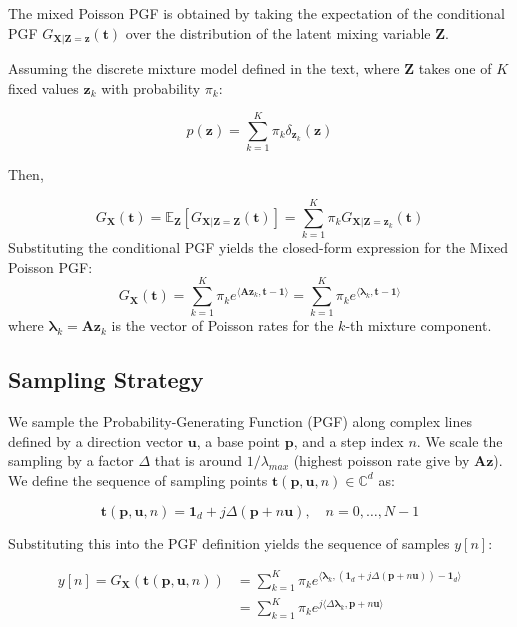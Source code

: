The mixed Poisson PGF is obtained by taking the expectation of the conditional PGF $G_{\mathbf{X}|\mathbf{Z}=\mathbf{z}}(\mathbf{t})$ over the distribution of the latent mixing variable $\mathbf{Z}$.

Assuming the discrete mixture model defined in the text, where $\mathbf{Z}$ takes one of $K$ fixed values $\mathbf{z}_k$ with probability $\pi_k$:

$$
p(\mathbf{z}) = \sum_{k=1}^{K} \pi_{k}\delta_{\mathbf{z}_{k}}(\mathbf{z})
$$

Then,

$$
G_{\mathbf{X}}(\mathbf{t}) = \mathbb{E}_{\mathbf{Z}}[G_{\mathbf{X}|\mathbf{Z}=\mathbf{Z}}(\mathbf{t})] = \sum_{k=1}^{K} \pi_k G_{\mathbf{X}|\mathbf{Z}=\mathbf{z}_k}(\mathbf{t})
$$
Substituting the conditional PGF yields the closed-form expression for the Mixed Poisson PGF:
$$
G_{\mathbf{X}}(\mathbf{t}) = \sum_{k=1}^{K}\pi_{k}e^{\langle \mathbf{A}\mathbf{z}_{k},\mathbf{t}-\mathbf{1}\rangle} = \sum_{k=1}^{K}\pi_{k}e^{\langle \boldsymbol{\lambda}_{k},\mathbf{t}-\mathbf{1}\rangle}
$$
where $\boldsymbol{\lambda}_k = \mathbf{A}\mathbf{z}_k$ is the vector of Poisson rates for the $k$-th mixture component.

\subsection*{Sampling Strategy}

We sample the Probability-Generating Function (PGF) along complex lines defined by a direction vector $\mathbf{u}$, a base point $\mathbf{p}$, and a step index $n$. We scale the sampling by a factor $\Delta$ that is around $1/\lambda_{max}$ (highest poisson rate give by $\textbf{Az}$). We define the sequence of sampling points $\mathbf{t}(\mathbf{p}, \mathbf{u}, n) \in \mathbb{C}^d$ as:

$$
\mathbf{t}(\mathbf{p}, \mathbf{u}, n) = \mathbf{1}_d + j \Delta (\mathbf{p} + n \mathbf{u}), \quad n = 0, \dots, N-1
$$

Substituting this into the PGF definition yields the sequence of samples $y[n]$:

\begin{align*}
y[n] = G_{\mathbf{X}}(\mathbf{t}(\mathbf{p}, \mathbf{u}, n)) &= \sum_{k=1}^{K} \pi_k e^{\langle \boldsymbol{\lambda}_k, (\mathbf{1}_d + j \Delta (\mathbf{p} + n \mathbf{u})) - \mathbf{1}_d \rangle} \\
&= \sum_{k=1}^{K} \pi_k e^{j \langle \Delta \boldsymbol{\lambda}_k, \mathbf{p} + n \mathbf{u} \rangle}
\end{align*}

